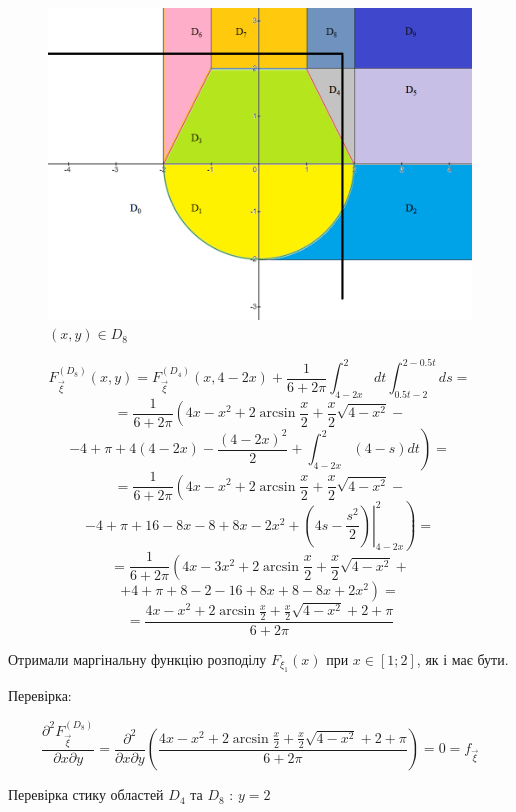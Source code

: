 \documentclass[14pt, a4paper, ukrainian]{extreport}
\begin{document}
	\begin{figure}[H]
		\centering
		\includegraphics[width=\textwidth]{./Image/Im_19_D_8.png}
		\caption{$(x, y) \in D_8$}
		\label{im:D_8}
	\end{figure}
	
	$$ F_{\vec \xi}^{\left(D_8\right)}(x, y) = F_{\vec \xi}^{\left(D_4\right)}(x, 4 - 2x) +  \frac{1}{6+2\pi}\int_{4 - 2x}^{2}dt\int_{0.5t - 2}^{2 - 0.5 t}ds = 
	$$
	$$ = \frac{1}{6+2\pi}\left(4x -x^2 + 2\arcsin\frac{x}{2} + \frac{x}{2}\sqrt{4-x^2} -  \right.
	$$
	$$ - \left.4 + \pi + 4(4 - 2x) - \frac{(4-2x)^2}{2} + \int_{4 - 2x}^{2}(4 - s)dt\right) = 
	$$
	$$ = \frac{1}{6+2\pi}\left(4x -x^2 + 2\arcsin\frac{x}{2} + \frac{x}{2}\sqrt{4-x^2} -  \right.
	$$
	$$ - \left.4 + \pi + 16 - 8x - 8 +8x -2x^2 + \left.\left(4s - \frac{s^2}{2}\right)\right|_{4-2x}^{2}\right) =
	$$
	$$ = \frac{1}{6+2\pi}\left(4x -3x^2 + 2\arcsin\frac{x}{2} + \frac{x}{2}\sqrt{4-x^2} + \right.
	$$
	$$ + \left.4 + \pi +8 - 2 - 16 + 8x + 8 - 8x +2x^2 \right) =
	$$
	$$ = \frac{4x - x^2 + 2\arcsin\frac{x}{2} + \frac{x}{2}\sqrt{4-x^2} + 2 + \pi}{6+2\pi}
	$$
	
	Отримали маргінальну функцію розподілу $ F_{\xi_1} (x) $ при $x \in [1; 2]$, як і має бути.
	
	Перевірка:
	
	$$\frac{\partial^2F_{\vec\xi}^{\left(D_8\right)}}{\partial x \partial y} = \frac{\partial^2}{\partial x \partial y} \left(\frac{4x - x^2 + 2\arcsin\frac{x}{2} + \frac{x}{2}\sqrt{4-x^2} + 2 + \pi}{6+2\pi}\right) = 0 = f_{\vec\xi}
	$$
	
	Перевірка стику областей $D_4$ та $D_8$ : $ y = 2$ 
	
\end{document}

